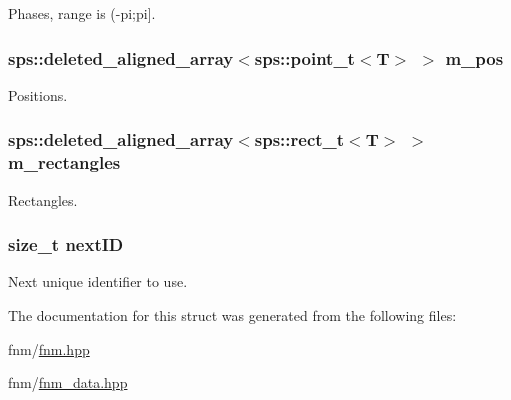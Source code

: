 Phases, range is (-\/pi;pi\mbox{]}. 

\hypertarget{singletonfnm_1_1ApertureData_aa1b289835c0e222f6b8f70e2fafc6769}{
\subsubsection[{m\+\_\+pos}]{\setlength{\rightskip}{0pt plus 5cm}sps\+::deleted\+\_\+aligned\+\_\+array$<$sps\+::point\+\_\+t$<$T$>$ $>$ m\+\_\+pos}}\label{singletonfnm_1_1ApertureData_aa1b289835c0e222f6b8f70e2fafc6769}


Positions. 

\hypertarget{singletonfnm_1_1ApertureData_a95dab395f62c1f3c1243d645a5179d4d}{
\subsubsection[{m\+\_\+rectangles}]{\setlength{\rightskip}{0pt plus 5cm}sps\+::deleted\+\_\+aligned\+\_\+array$<$sps\+::rect\+\_\+t$<$T$>$ $>$ m\+\_\+rectangles}}\label{singletonfnm_1_1ApertureData_a95dab395f62c1f3c1243d645a5179d4d}


Rectangles. 

\hypertarget{singletonfnm_1_1ApertureData_a52f7f46dd8600d6c7f736234eff59da8}{
\subsubsection[{next\+I\+D}]{\setlength{\rightskip}{0pt plus 5cm}size\+\_\+t next\+I\+D\hspace{0.3cm}{\ttfamily [static]}}}\label{singletonfnm_1_1ApertureData_a52f7f46dd8600d6c7f736234eff59da8}


Next unique identifier to use. 



The documentation for this struct was generated from the following files\+:\begin{DoxyCompactItemize}
\item 
fnm/\hyperlink{fnm_8hpp}{fnm.\+hpp}\item 
fnm/\hyperlink{fnm__data_8hpp}{fnm\+\_\+data.\+hpp}\end{DoxyCompactItemize}

